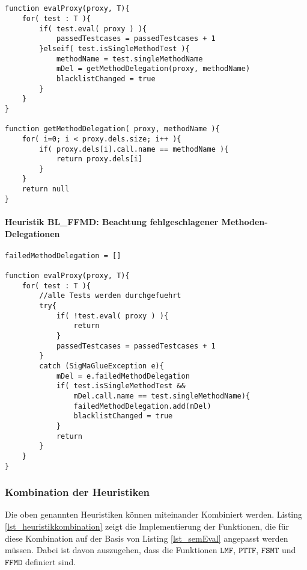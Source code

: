 \documentclass[a4paper,12pt]{article}
\begin{document}
\begin{lstlisting}[style = pseudo, caption = Semantische Evaluation mit Heuristik SMTE, captionpos = b, label = lst_semEval_SMTE]


function evalProxy(proxy, T){
	for( test : T ){	
		if( test.eval( proxy ) ){
			passedTestcases = passedTestcases + 1
		}elseif( test.isSingleMethodTest ){
			methodName = test.singleMethodName
			mDel = getMethodDelegation(proxy, methodName)
			blacklistChanged = true
		}		
	}
}

function getMethodDelegation( proxy, methodName ){
	for( i=0; i < proxy.dels.size; i++ ){
		if( proxy.dels[i].call.name == methodName ){
			return proxy.dels[i]
		}
	}
	return null
}

\end{lstlisting}



\paragraph{Heuristik BL\_FFMD: Beachtung fehlgeschlagener Methoden-Delegationen}
\noindent
\newline


\begin{lstlisting}[style = pseudo, caption = Abfangen der SigMaGlueException beim Testen eines Proxies, captionpos = b, label = lst_evalProxyFNDE]
failedMethodDelegation = []

function evalProxy(proxy, T){
	for( test : T ){
		//alle Tests werden durchgefuehrt	
		try{
			if( !test.eval( proxy ) ){
				return
			}
			passedTestcases = passedTestcases + 1
		}
		catch (SigMaGlueException e){
			mDel = e.failedMethodDelegation
			if( test.isSingleMethodTest && 
				mDel.call.name == test.singleMethodName){
				failedMethodDelegation.add(mDel)
				blacklistChanged = true		
			}		
			return
		} 
	}
}
\end{lstlisting}


\subsubsection{Kombination der Heuristiken}
Die oben genannten Heuristiken können miteinander Kombiniert werden. Listing \ref{lst_heuristikkombination} zeigt die Implementierung der Funktionen, die für diese Kombination auf der Basis von Listing \ref{lst_semEval} angepasst werden müssen. Dabei ist  davon auszugehen, dass die Funktionen $\texttt{LMF}$, $\texttt{PTTF}$, $\texttt{FSMT}$ und $\texttt{FFMD}$ definiert sind.
\end{document}
